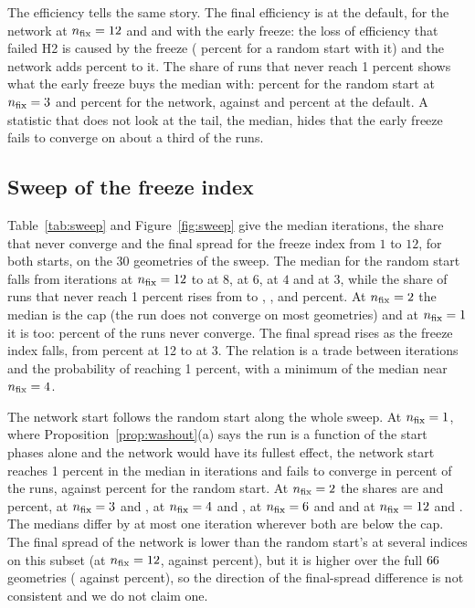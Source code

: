 The efficiency tells the same story. The final efficiency is \effmRTwelve{} at the default, \effmNTwelve{} for the network at $n_{\mathrm{fix}}=12$ and \effmRThree{} and \effmNThree{} with the early freeze: the loss of efficiency that failed H2 is caused by the freeze (\effdRThree{} percent for a random start with it) and the network adds \effdNThreeRThree{} percent to it. The share of runs that never reach 1 percent shows what the early freeze buys the median with: \neverRThree{} percent for the random start at $n_{\mathrm{fix}}=3$ and \neverNThree{} percent for the network, against \neverRTwelve{} and \neverNTwelve{} percent at the default.
A statistic that does not look at the tail, the median, hides that the early freeze fails to converge on about a third of the runs.

\subsection{Sweep of the freeze index}\label{sec:abl-sweep}

Table~\ref{tab:sweep} and Figure~\ref{fig:sweep} give the median iterations, the share that never converge and the final spread for the freeze index from $1$ to $12$, for both starts, on the $30$ geometries of the sweep. The median for the random start falls from \swTwelve{} iterations at $n_{\mathrm{fix}}=12$ to \swEight{} at $8$, \swSix{} at $6$, \swFour{} at $4$ and \swThree{} at $3$, while the share of runs that never reach 1 percent rises from \swTwelveNever{} to \swEightNever{}, \swSixNever{}, \swFourNever{} and \swThreeNever{} percent. At $n_{\mathrm{fix}}=2$ the median is the cap (the run does not converge on most geometries) and at $n_{\mathrm{fix}}=1$ it is too:
\swOneNever{} percent of the runs never converge. The final spread rises as the freeze index falls, from \swTwelveFin{} percent at 12 to \swThreeFin{} at 3. The relation is a trade between iterations and the probability of reaching 1 percent, with a minimum of the median near $n_{\mathrm{fix}}=4$.

The network start follows the random start along the whole sweep. At $n_{\mathrm{fix}}=1$, where Proposition~\ref{prop:washout}(a) says the run is a function of the start phases alone and the network would have its fullest effect, the network start reaches 1 percent in the median in \swnOne{} iterations and fails to converge in \swnOneNever{} percent of the runs, against \swOneNever{} percent for the random start. At $n_{\mathrm{fix}}=2$ the shares are \swnTwoNever{} and \swTwoNever{} percent, at $n_{\mathrm{fix}}=3$ \swnThreeNever{} and \swThreeNever{}, at $n_{\mathrm{fix}}=4$ \swnFourNever{} and \swFourNever{}, at $n_{\mathrm{fix}}=6$ \swnSixNever{} and \swSixNever{} and at $n_{\mathrm{fix}}=12$ \swnTwelveNever{} and \swTwelveNever{}. The medians differ by at most one iteration
wherever both are below the cap. The final spread of the network is lower than the random start's at several indices on this subset (at $n_{\mathrm{fix}}=12$, \swnTwelveFin{} against \swTwelveFin{} percent), but it is higher over the full $66$ geometries (\finNTwelve{} against \finRTwelve{} percent), so the direction of the final-spread difference is not consistent and we do not claim one.


